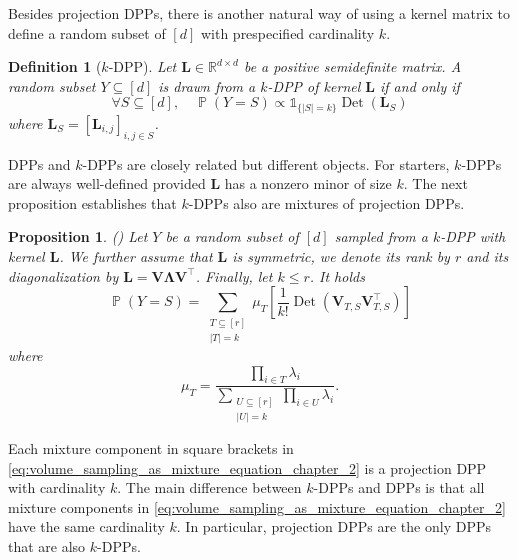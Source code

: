 \documentclass[twoside,11pt]{book}
\newtheorem{proposition}{Proposition}
\newtheorem{definition}{Definition}
\numberwithin{theorem}{chapter}
\numberwithin{definition}{chapter}
\numberwithin{proposition}{chapter}
\numberwithin{corollary}{chapter}
\numberwithin{example}{chapter}
\numberwithin{lemma}{chapter}
\numberwithin{assumption}{chapter}
\DeclareMathOperator{\Det}{Det}
\DeclareMathOperator{\Tran}{\intercal}
\DeclareMathOperator{\Prb}{\mathbb{P}}
\begin{document}
Besides projection DPPs, there is another natural way of using a kernel matrix to define a random subset of $[d]$ with prespecified cardinality $k$.
\begin{definition}[$k$-DPP]\label{def:kDPP}
Let $\bm{L} \in \mathbb{R}^{d\times d}$ be a positive semidefinite matrix.
A random subset $Y \subseteq [d]$ is drawn from a $k$-DPP of kernel $\bm{L}$ if and only if
\begin{equation}\label{eq:def_kdpp}
\forall S \subseteq [d],\quad \Prb(Y = S) \propto \mathbb{1}_{\{\vert S\vert = k\}}\Det(\bm{L}_{S})
\end{equation}
where $\bm{L}_{S} = [\bm{L}_{i,j}]_{i,j \in S}$.
\end{definition}
DPPs and $k$-DPPs are closely related but different objects. For starters, $k$-DPPs are always well-defined provided $\bm{L}$ has a nonzero minor of size $k$. The next proposition establishes that $k$-DPPs also are mixtures of projection DPPs.
\begin{proposition}(\citet[Section 5.2.2]{KuTa12})
\label{prop:kdpp_mixture_proposition}
Let $Y$ be a random subset of $[d]$ sampled from a $k$-DPP with kernel $\bm{L}$. We further assume that $\bm L$ is symmetric, we denote its rank by $r$ and its diagonalization by $\bm L = \bm{V}\bm{\Lambda}\bm{V}^{\Tran}$. Finally, let $k\leq r$. It holds
\begin{equation}
\label{eq:volume_sampling_as_mixture_equation_chapter_2}
\Prb(Y = S) = \sum\limits_{\substack{T \subseteq [r]\\|T| = k}} \mu_{T} \left[\frac{1}{k!} \Det\left(\bm{V}_{T,S}\bm{V}^{\Tran}_{T,S}\right)\right]
\end{equation}
where
\begin{equation}
\mu_{T} = \frac{\prod_{i \in T}\lambda_{i}}{\sum\limits_{\substack{U \subseteq[r]\\ |U| = k}}\prod_{i \in U}\lambda_{i}}.
\label{e:kDPPWeights}
\end{equation}
\end{proposition}
Each mixture component in square brackets in \eqref{eq:volume_sampling_as_mixture_equation_chapter_2} is a projection DPP with cardinality $k$. The main difference between $k$-DPPs and DPPs is that all mixture components in \eqref{eq:volume_sampling_as_mixture_equation_chapter_2} have the same cardinality $k$. In particular, projection DPPs are the only DPPs that are also $k$-DPPs.
\end{document}
